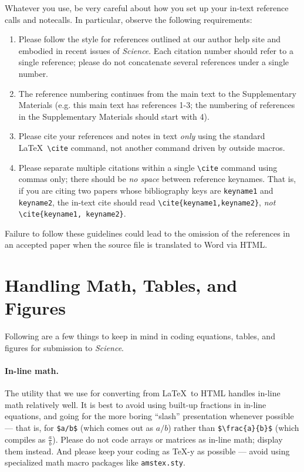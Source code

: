 \documentclass[12pt]{article}
\begin{document}
Whatever you use, be
very careful about how you set up your in-text reference calls and
notecalls.  In particular, observe the following requirements:

\begin{enumerate}
\item Please follow the style for references outlined at our author
  help site and embodied in recent issues of {\it Science}.  Each
  citation number should refer to a single reference; please do not
  concatenate several references under a single number.
\item The reference numbering  continues from the 
main text to the Supplementary Materials (e.g. this main 
text has references 1-3; the numbering of references in the 
Supplementary Materials should start with 4). 
\item Please cite your references and notes in text {\it only\/} using
  the standard \LaTeX\ \verb+\cite+ command, not another command
  driven by outside macros.
\item Please separate multiple citations within a single \verb+\cite+
  command using commas only; there should be {\it no space\/}
  between reference keynames.  That is, if you are citing two
  papers whose bibliography keys are \texttt{keyname1} and
  \texttt{keyname2}, the in-text cite should read
  \verb+\cite{keyname1,keyname2}+, {\it not\/}
  \verb+\cite{keyname1, keyname2}+.
\end{enumerate}

\noindent Failure to follow these guidelines could lead
to the omission of the references in an accepted paper when the source
file is translated to Word via HTML.



\section*{Handling Math, Tables, and Figures}

Following are a few things to keep in mind in coding equations,
tables, and figures for submission to {\it Science}.

\paragraph*{In-line math.}  The utility that we use for converting
from \LaTeX\ to HTML handles in-line math relatively well.  It is best
to avoid using built-up fractions in in-line equations, and going for
the more boring ``slash'' presentation whenever possible --- that is,
for \verb+$a/b$+ (which comes out as $a/b$) rather than
\verb+$\frac{a}{b}$+ (which compiles as $\frac{a}{b}$).  
 Please do not code arrays or matrices as
in-line math; display them instead.  And please keep your coding as
\TeX-y as possible --- avoid using specialized math macro packages
like \texttt{amstex.sty}.
\end{document}
